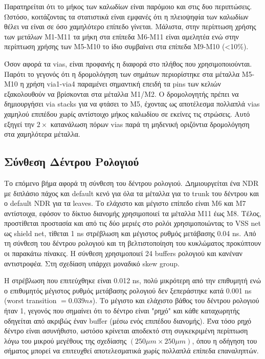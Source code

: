 Παρατηρείται ότι το μήκος των καλωδίων είναι παρόμοιο και στις δυο περιπτώσεις.
Ωστόσο, κοιτάζοντας τα στατιστικά είναι εμφανές ότι η πλειοψηφία των καλωδίων θέλει να είναι σε όσο χαμηλότερο επίπεδο γίνεται. Μάλιστα, στην περίπτωση χρήσης των μετάλων M1-M11 τα μήκη στα επίπεδα M6-M11 είναι αμελητέα ενώ στην περίπτωση χρήσης των M5-M10 το ίδιο συμβαίνει στα επίπεδα M9-M10 (<10\%).

Όσον αφορά τα vias, είναι προφανής η διαφορά στο πλήθος που χρησιμοποιούνται.
Παρότι το γεγονός ότι η δρομολόγηση των σημάτων περιορίστηκε στα μέταλλα M5-M10 η χρήση via1-via4 παραμένει σημαντική επειδή τα pins των κελιών εξακολουθούν να βρίσκονται στα μέταλλα M1/M2.
Ο δρομολογητής πρέπει να δημιουργήσει via stacks για να φτάσει το M5, έχοντας ως αποτέλεσμα πολλαπλά vias χαμηλού επιπέδου χωρίς αντίστοιχο μήκος καλωδίου σε εκείνες τις στρώσεις.
Αυτό εξηγεί την $2\times$ κατανάλωση πόρων vias παρά τη μηδενική οριζόντια δρομολόγηση στα χαμηλότερα μέταλλα.

\subsection{Σύνθεση Δέντρου Ρολογιού}

Το επόμενο βήμα αφορά τη σύνθεση του δέντρου ρολογιού. Δημιουργείται ένα NDR με διπλάσιο πάχος και default κενό για όλα τα μέταλλα για το trunk του δέντρου και ο default NDR για τα leaves.
Το ελάχιστο και μέγιστο επίπεδο είναι M6 και M7 αντίστοιχα, εφόσον το δίκτυο διανομής χρησιμοποιεί τα μέταλλα M11 έως M8. Τέλος, προστίθεται προστασία και από τις δύο μεριές στο ρολόι χρησιμοποιώντας το VSS net ως shield net, τίθεται 1 ns στρέβλωση και μέγιστος ρυθμός μετάβασης 0.04 ns.
Από τη σύνθεση του δέντρου ρολογιού και τη βελτιστοποίηση του κυκλώματος προκύπτουν οι παρακάτω πίνακες.
Η σύνθεση χρησιμοποιεί 24 buffers ρολογιού και κανέναν αντιστροφέα. Στη σχεδίαση υπάρχει μοναδικό skew group.

Η στρέβλωση που επιτεύχθηκε είναι 0.012 ns, πολύ μικρότερη από την επιθυμητή ενώ ο επιθυμητός μέγιστος ρυθμός μετάβασης ρολογιού δεν ξεπεράστηκε κατά 0.001 ns (worst transition $= 0.039ns$).
Το μέγιστο και ελάχιστο βάθος του δέντρου ρολογιού ήταν 1, γεγονός που σημαίνει ότι το δέντρο είναι "ρηχό" και κάθε καταχωρητής οδηγείται από ακριβώς έναν buffer (μέσω ενός επιπέδου διανομής).
Ένα τόσο ρηχό δέντρο είναι ασυνήθιστο, ωστόσο κρίνεται αποδεκτό στη συγκεκριμένη περίπτωση λόγω του μικρού μεγέθους της σχεδίασης $(250\mu m \times 250\mu m)$, όπου η οδήγηση του σήματος μπορεί να επιτευχθεί αποτελεσματικά χωρίς πολλαπλά επίπεδα επαναληπτών.

